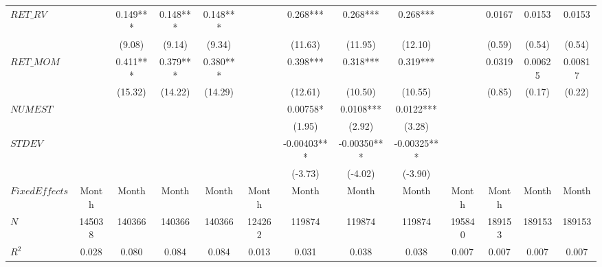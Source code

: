 \begin{tabular}{l|cccc|cccc|cccc}
$RET\_RV$ &         & 0.149*** & 0.148*** & 0.148*** &         & 0.268*** & 0.268*** & 0.268*** &         & 0.0167  & 0.0153  & 0.0153 \\
        &         & (9.08)  & (9.14)  & (9.34)  &         & (11.63) & (11.95) & (12.10) &         & (0.59)  & (0.54)  & (0.54) \\
$RET\_MOM$ &         & 0.411*** & 0.379*** & 0.380*** &         & 0.398*** & 0.318*** & 0.319*** &         & 0.0319  & 0.00625 & 0.00817 \\
        &         & (15.32) & (14.22) & (14.29) &         & (12.61) & (10.50) & (10.55) &         & (0.85)  & (0.17)  & (0.22) \\
$NUMEST$ &         &         &         &         &         & 0.00758* & 0.0108*** & 0.0122*** &         &         &         &  \\
        &         &         &         &         &         & (1.95)  & (2.92)  & (3.28)  &         &         &         &  \\
$STDEV$ &         &         &         &         &         & -0.00403*** & -0.00350*** & -0.00325*** &         &         &         &  \\
        &         &         &         &         &         & (-3.73) & (-4.02) & (-3.90) &         &         &         &  \bigstrut[b]\\
\hline
$Fixed Effects$ & Month   & Month   & Month   & Month   & Month   & Month   & Month   & Month   & Month   & Month   & Month   & Month \bigstrut[t]\\
$N$     & 145038  & 140366  & 140366  & 140366  & 124262  & 119874  & 119874  & 119874  & 195840  & 189153  & 189153  & 189153 \\
$R^2$   & 0.028   & 0.080   & 0.084   & 0.084   & 0.013   & 0.031   & 0.038   & 0.038   & 0.007   & 0.007   & 0.007   & 0.007 \bigstrut[b]\\
\hline
\hline
\end{tabular}%
